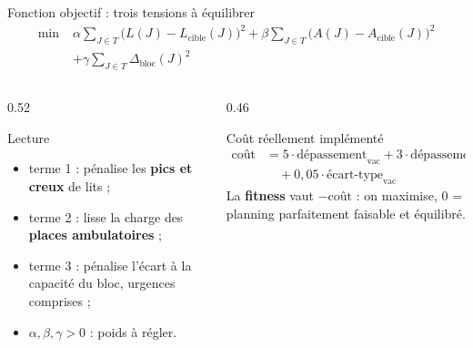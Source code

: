 \begin{frame}{Fonction objectif : trois tensions à équilibrer}
  \footnotesize
  \[
    \begin{aligned}
      \min\; & \alpha \sum_{J \in T}\bigl(L(J)-L_{\text{cible}}(J)\bigr)^2
             + \beta \sum_{J \in T}\bigl(A(J)-A_{\text{cible}}(J)\bigr)^2 \\
             & + \gamma \sum_{J \in T}\Delta_{\text{bloc}}(J)^2
    \end{aligned}
  \]
  \begin{columns}[T,onlytextwidth]
    \begin{column}{0.52\textwidth}
      \begin{block}{Lecture}
        \begin{itemize}
          \item terme 1 : pénalise les \textbf{pics et creux} de lits ;
          \item terme 2 : lisse la charge des \textbf{places ambulatoires} ;
          \item terme 3 : pénalise l'écart à la capacité du bloc, urgences
            comprises ;
          \item $\alpha,\beta,\gamma>0$ : poids à régler.
        \end{itemize}
      \end{block}
    \end{column}
    \begin{column}{0.46\textwidth}
      \begin{alertblock}{Coût réellement implémenté}
        \footnotesize
        \[
          \begin{aligned}
            \text{coût} &= 5 \cdot \text{dépassement}_{\text{vac}}
                          + 3 \cdot \text{dépassement}_{\text{lits}} \\
                         &\quad + 0{,}05 \cdot \text{écart-type}_{\text{vac}}
          \end{aligned}
        \]
        La \textbf{fitness} vaut $-\text{coût}$ : on maximise, $0$ = planning
        parfaitement faisable et équilibré.
      \end{alertblock}
    \end{column}
  \end{columns}
\end{frame}

